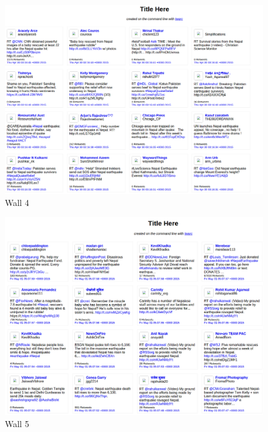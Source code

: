 \begin{enumerate}
\newpage
\begin{figure}[ht]    
    \begin{center}
        \includegraphics[scale=0.40]{graphs/wall4.png}
        \caption{Wall 4}
    \end{center}
\end{figure}

\newpage
\begin{figure}[ht]    
    \begin{center}
        \includegraphics[scale=0.40]{graphs/wall5.png}
        \caption{Wall 5}
    \end{center}
\end{figure}

\newpage

\end{enumerate}
